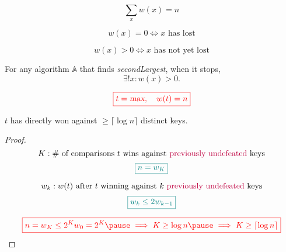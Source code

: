 \begin{frame}{}
  \[
    \sum_x w(x) = n
  \]

  \pause
  \[
    w(x) = 0 \iff x \text{ has lost}
  \]

  \pause
  \[
    w(x) > 0 \iff x \text{ has not yet lost}
  \]

  \pause
  \begin{theorem}
    For any algorithm $\mathbb{A}$ that finds \textsl{secondLargest}, when it stops,
    \[
      \exists! x: w(x) > 0.
    \]
  \end{theorem}

  \pause
  \[
    \textcolor{red}{\boxed{t = \textsl{max}, \quad w(t) = n}}
  \]
\end{frame}

\begin{frame}{}
  \begin{theorem}
    $t$ has directly won against $\ge \lceil \log n \rceil$ distinct keys.
  \end{theorem}

  \pause
  \begin{proof}
    \[
      K: \# \text{ of comparisons } t \text{ wins against \textcolor{purple}{previously undefeated} keys}
    \]
    \pause
    \vspace{-0.30cm}
    \[
      \textcolor{teal}{\boxed{n = w_K}}
    \]

    \pause
    \vspace{-0.30cm}
    \[
      w_k: w(t) \text{ after } t \text{ winning against } k \text{ \textcolor{purple}{previously undefeated} keys}
    \]
    \pause
    \vspace{-0.30cm}
    \[
      \textcolor{teal}{\boxed{w_k \le 2 w_{k-1}}}
    \]

    \pause
    \[
      \red{\boxed{n = w_K \le 2^K w_0 = 2^K \pause \implies K \ge \log n \pause \implies K \ge \lceil \log n \rceil}}
    \]
  \end{proof}
\end{frame}

